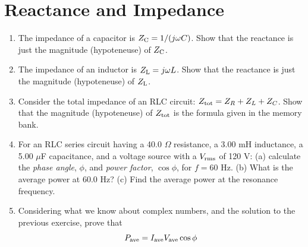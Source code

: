 \documentclass{article}
\begin{document}
\section{Reactance and Impedance}

\begin{enumerate}
\item The impedance of a capacitor is $Z_{\rm C} = 1/(j\omega C)$.  Show that the reactance is just the magnitude (hypoteneuse) of $Z_{\rm C}$. \\ \vspace{2cm}
\item The impedance of an inductor is $Z_{\rm L} = j\omega L$.  Show that the reactance is just the magnitude (hypoteneuse) of $Z_{\rm L}$. \\ \vspace{2cm}
\item Consider the total impedance of an RLC circuit: $Z_{\rm tot} = Z_R + Z_L + Z_C$.  Show that the magnitude (hypoteneuse) of $Z_{\rm tot}$ is the formula given in the memory bank. \\ \vspace{3cm}
\item For an RLC series circuit having a 40.0 $\Omega$ resistance, a 3.00 mH inductance, a 5.00 $\mu$F capacitance, and a voltage source with a $V_{\rm rms}$ of 120 V: (a) calculate the \textit{phase angle}, $\phi$, and \textit{power factor}, $\cos\phi$, for $f = 60$ Hz. (b) What is the average power at 60.0 Hz? (c) Find the average power at the resonance frequency. \\ \vspace{3cm}
\item Considering what we know about complex numbers, and the solution to the previous exercise, prove that
\begin{equation}
P_{\rm ave} = I_{\rm ave} V_{\rm ave} \cos\phi
\end{equation}
\end{enumerate}
\end{document}
